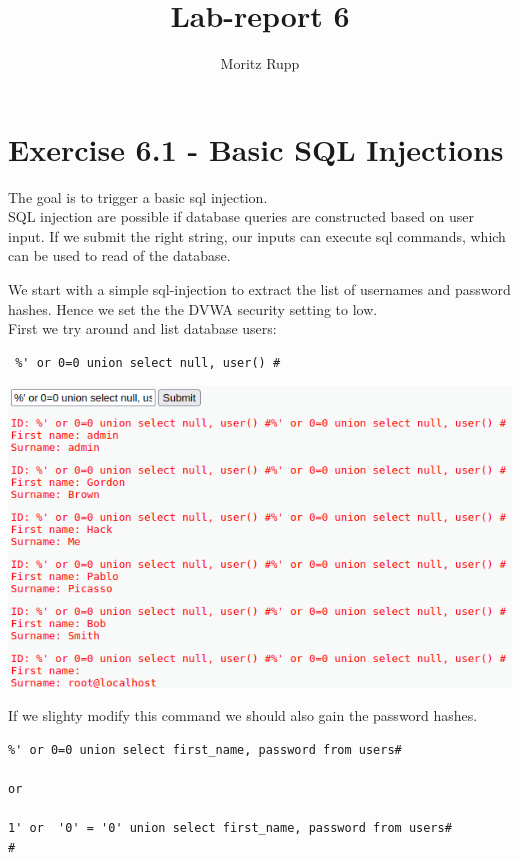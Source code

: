 \documentclass[a4paper,10pt]{article}
\title{Lab-report 6}
\author{Moritz Rupp}
\begin{document}
\maketitle

\begin{abstract}

\end{abstract}
\newpage
\section{Exercise 6.1 - Basic SQL Injections}
The goal is to trigger a basic sql injection.\\
SQL injection are possible if database queries are constructed based on user input. If we submit the right string, our inputs can execute sql commands, which can be used to read of the database. 

We start with a simple sql-injection to extract the list of usernames and password hashes. Hence we set the the DVWA security setting to low. \\
First we try around and list database users:\\
\begin{verbatim}
 %' or 0=0 union select null, user() #

\end{verbatim}

\begin{center}
 \includegraphics[scale=0.4]{first.png}
\end{center}
If we slighty modify this command we should also gain the password hashes.
\begin{verbatim}
%' or 0=0 union select first_name, password from users#

or

1' or  '0' = '0' union select first_name, password from users#
#
\end{verbatim}
\end{document}

